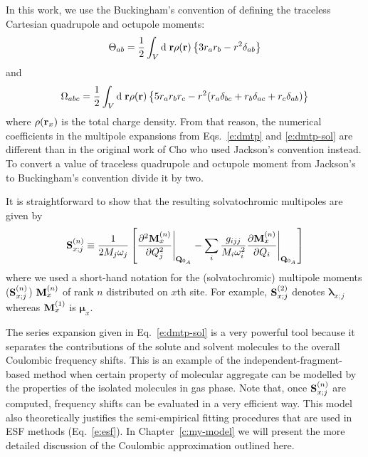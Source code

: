 \documentclass[b5paper,oneside,fleqn,11pt]{book}
\newcommand{\BM}[1]{\bm{#1}}
\begin{document}
\begin{refsection}
In this work, we use the Buckingham's convention of defining the traceless Cartesian
quadrupole and octupole moments: \citep{Buckingham.QRevChemSoc.1959} 
%
\begin{equation} \label{e:quad-trac}
\Theta_{ab} = \frac{1}{2} \int_V {\rm d}\;{\bf r} \rho({\bf r}) \left\{ 3r_ar_b-r^2 \delta_{ab}\right\}
\end{equation}
%
and 
%
\begin{equation} \label{e:oct-trac}
\Omega_{abc} = \frac{1}{2} \int_V {\rm d}\;{\bf r} \rho({\bf r}) \left\{ 5r_ar_br_c-r^2(r_a\delta_{bc}+
                                                                     r_b\delta_{ac}+
                                                                     r_c\delta_{ab})\right\}
\end{equation}
%
where $\rho({\bf r}_x)$ is the total charge density.
From that reason, the numerical coefficients in the multipole expansions 
from Eqs.~\eqref{e:dmtp} and \eqref{e:dmtp-sol}
are different than in the original work of Cho \citep{Cho.JCP.2009} who used 
Jackson's convention instead. \citep{Jackson.ClassicalElectrodynamics.1998} 
To convert a value of traceless
quadrupole and octupole moment from Jackson's to Buckingham's convention
divide it by two.

It is straightforward to show that the resulting solvatochromic multipoles
are given by
%
\begin{equation} \label{e:solvatochromic-multipoles}
 {\bf S}^{(n)}_{x;j} \equiv \frac{1}{2M_j\omega_j} \left[ 
     \frac{\partial^2 {\bf M}^{(n)}_{x} }{\partial Q_j^2} \Bigg|_{{\bf Q}_{0_A}}
-
\sum_i \frac{g_{ijj}}{M_i\omega_i^2} 
\frac{\partial {\bf M}^{(n)}_{x} }{\partial Q_i} \Bigg|_{{\bf Q}_{0_A}}
\right]
\end{equation}
%
where we used a short\hyp{}hand notation for the (solvatochromic) multipole moments
(${\bf S}^{(n)}_{x;j}$) ${\bf M}^{(n)}_{x}$
of rank $n$ distributed on $x$th site. For example, ${\bf S}^{(2)}_{x;j}$
denotes ${\BM \lambda}_{x;j}$ whereas ${\bf M}^{(1)}_{x}$ is ${\BM \mu}_x$.

The series expansion given in Eq.~\eqref{e:dmtp-sol} is a very powerful tool because
it separates the contributions of the solute and solvent molecules to the overall Coulombic
frequency shifts. This is an example of the independent-fragment-based method
when certain property of molecular aggregate can be modelled by the properties
of the isolated molecules in gas phase. Note that, once ${\bf S}^{(n)}_{x;j}$
are computed, frequency shifts can be evaluated in a very efficient way.
This model also theoretically justifies the semi\hyp{}empirical fitting procedures 
that are used in ESF methods (Eq.~\eqref{e:esf}).
In Chapter~\ref{c:my-model} we will present the more detailed discussion of the Coulombic
approximation outlined here.



\end{refsection}
\end{document}
